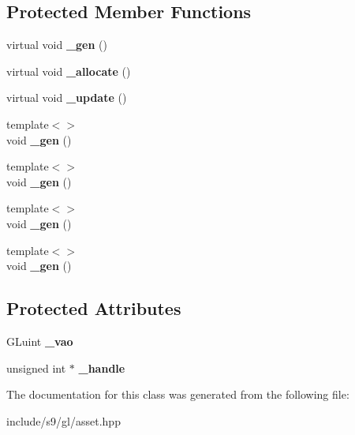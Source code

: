 \subsection*{Protected Member Functions}
\begin{DoxyCompactItemize}
\item 
\hypertarget{classs9_1_1gl_1_1Asset_ad03fd53ceb41290c7a90a2c3ab9fab8f}{virtual void {\bfseries \-\_\-gen} ()}\label{classs9_1_1gl_1_1Asset_ad03fd53ceb41290c7a90a2c3ab9fab8f}

\item 
\hypertarget{classs9_1_1gl_1_1Asset_a53948833da532bbd04c75063f631e799}{virtual void {\bfseries \-\_\-allocate} ()}\label{classs9_1_1gl_1_1Asset_a53948833da532bbd04c75063f631e799}

\item 
\hypertarget{classs9_1_1gl_1_1Asset_a4c9866e331f83db5b26342339a26aad5}{virtual void {\bfseries \-\_\-update} ()}\label{classs9_1_1gl_1_1Asset_a4c9866e331f83db5b26342339a26aad5}

\item 
\hypertarget{classs9_1_1gl_1_1Asset_a90e0ab0337352cdd2a2cb5267c7f5b9f}{{\footnotesize template$<$$>$ }\\void {\bfseries \-\_\-gen} ()}\label{classs9_1_1gl_1_1Asset_a90e0ab0337352cdd2a2cb5267c7f5b9f}

\item 
\hypertarget{classs9_1_1gl_1_1Asset_a317ae66dfcf4518582d8c0c219c2e721}{{\footnotesize template$<$$>$ }\\void {\bfseries \-\_\-gen} ()}\label{classs9_1_1gl_1_1Asset_a317ae66dfcf4518582d8c0c219c2e721}

\item 
\hypertarget{classs9_1_1gl_1_1Asset_ab99c6a86c744446056b6c6b14385547b}{{\footnotesize template$<$$>$ }\\void {\bfseries \-\_\-gen} ()}\label{classs9_1_1gl_1_1Asset_ab99c6a86c744446056b6c6b14385547b}

\item 
\hypertarget{classs9_1_1gl_1_1Asset_a484420b3d6bf8f5824f9e2ae5deb2e4c}{{\footnotesize template$<$$>$ }\\void {\bfseries \-\_\-gen} ()}\label{classs9_1_1gl_1_1Asset_a484420b3d6bf8f5824f9e2ae5deb2e4c}

\end{DoxyCompactItemize}
\subsection*{Protected Attributes}
\begin{DoxyCompactItemize}
\item 
\hypertarget{classs9_1_1gl_1_1Asset_a081a30bb6bb16cfebbee2e76e5447f31}{G\-Luint {\bfseries \-\_\-vao}}\label{classs9_1_1gl_1_1Asset_a081a30bb6bb16cfebbee2e76e5447f31}

\item 
\hypertarget{classs9_1_1gl_1_1Asset_abd42fcd8610f1429f0e94ad24b1a9db9}{unsigned int $\ast$ {\bfseries \-\_\-handle}}\label{classs9_1_1gl_1_1Asset_abd42fcd8610f1429f0e94ad24b1a9db9}

\end{DoxyCompactItemize}


The documentation for this class was generated from the following file\-:\begin{DoxyCompactItemize}
\item 
include/s9/gl/asset.\-hpp\end{DoxyCompactItemize}
